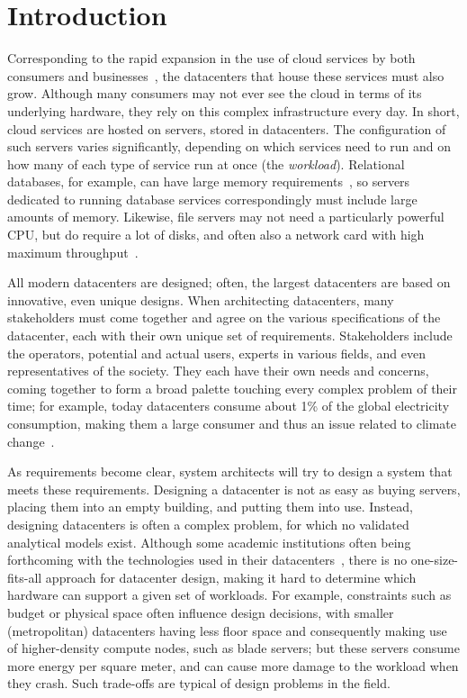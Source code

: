 \documentclass[11pt]{article}
\begin{document}
\section{Introduction} \label{sec:introduction}
	Corresponding to the rapid expansion in the use of cloud services by both consumers and businesses~\cite{Kushida2015}\cite{mokhtar2013}, the datacenters that house these services must also grow. 
	Although many consumers may not ever see the cloud in terms of its underlying hardware, they rely on this complex infrastructure every day. In short, cloud services are hosted on servers, stored in datacenters. 
	The configuration of such servers varies significantly, depending on which services need to run and on how many of each type of service run at once (the \textit{workload}).
	Relational databases, for example, can have large memory requirements~\cite{Kabakus2017}, so servers dedicated to running database services correspondingly must include large amounts of memory. 
	Likewise, file servers may not need a particularly powerful CPU, but do require a lot of disks, and often also a network card with high maximum throughput~\cite{Drapeau1994}.

	All modern datacenters are designed; often, the largest datacenters are based on innovative, even unique designs.
	When architecting datacenters, many stakeholders must come together and agree on the various specifications of the datacenter, each with their own unique set of requirements. 
	Stakeholders include the operators, potential and actual users, experts in various fields, and even representatives of the society.
	They each have their own needs and concerns, coming together to form a broad palette touching every complex problem of their time; for example, today datacenters consume about 1\% of the global electricity consumption, making them a large consumer and thus an issue related to climate change~\cite{Masanet2020}.

	As requirements become clear, system architects will try to design a system that meets these requirements. 
	Designing a datacenter is not as easy as buying servers, placing them into an empty building, and putting them into use. 
	Instead, designing datacenters is often a complex problem, for which no validated analytical models exist. 
	Although some academic institutions often being forthcoming with the technologies used in their datacenters~\cite{SURF2020}, there is no one-size-fits-all approach for datacenter design, making it hard to determine which hardware can support a given set of workloads.
	For example, constraints such as budget or physical space often influence design decisions, with smaller (metropolitan) datacenters having less floor space and consequently making use of higher-density compute nodes, such as blade servers; but these servers consume more energy per square meter, and can cause more damage to the workload when they crash. Such trade-offs are typical of design problems in the field. 
	
\end{document}
